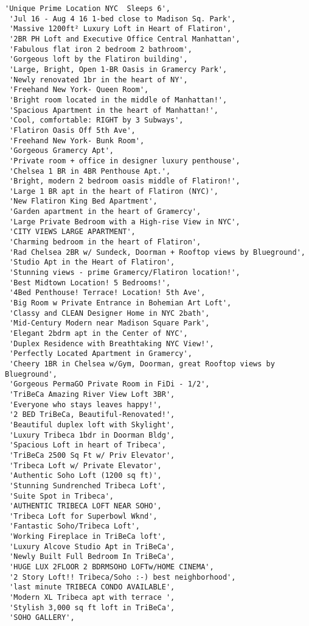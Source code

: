 \documentclass[11pt]{article}
\begin{document}
\begin{tcolorbox}[breakable, size=fbox, boxrule=.5pt, pad at break*=1mm, opacityfill=0]
\begin{Verbatim}[commandchars=\\\{\}]
 'Unique Prime Location NYC  Sleeps 6',
 'Jul 16 - Aug 4 16 1-bed close to Madison Sq. Park',
 'Massive 1200ft² Luxury Loft in Heart of Flatiron',
 '2BR PH Loft and Executive Office Central Manhattan',
 'Fabulous flat iron 2 bedroom 2 bathroom',
 'Gorgeous loft by the Flatiron building',
 'Large, Bright, Open 1-BR Oasis in Gramercy Park',
 'Newly renovated 1br in the heart of NY',
 'Freehand New York- Queen Room',
 'Bright room located in the middle of Manhattan!',
 'Spacious Apartment in the heart of Manhattan!',
 'Cool, comfortable: RIGHT by 3 Subways',
 'Flatiron Oasis Off 5th Ave',
 'Freehand New York- Bunk Room',
 'Gorgeous Gramercy Apt',
 'Private room + office in designer luxury penthouse',
 'Chelsea 1 BR in 4BR Penthouse Apt.',
 'Bright, modern 2 bedroom oasis middle of Flatiron!',
 'Large 1 BR apt in the heart of Flatiron (NYC)',
 'New Flatiron King Bed Apartment',
 'Garden apartment in the heart of Gramercy',
 'Large Private Bedroom with a High-rise View in NYC',
 'CITY VIEWS LARGE APARTMENT',
 'Charming bedroom in the heart of Flatiron',
 'Rad Chelsea 2BR w/ Sundeck, Doorman + Rooftop views by Blueground',
 'Studio Apt in the Heart of Flatiron',
 'Stunning views - prime Gramercy/Flatiron location!',
 'Best Midtown Location! 5 Bedrooms!',
 '4Bed Penthouse! Terrace! Location! 5th Ave',
 'Big Room w Private Entrance in Bohemian Art Loft',
 'Classy and CLEAN Designer Home in NYC 2bath',
 'Mid-Century Modern near Madison Square Park',
 'Elegant 2bdrm apt in the Center of NYC',
 'Duplex Residence with Breathtaking NYC View!',
 'Perfectly Located Apartment in Gramercy',
 'Cheery 1BR in Chelsea w/Gym, Doorman, great Rooftop views by Blueground',
 'Gorgeous PermaGO Private Room in FiDi - 1/2',
 'TriBeCa Amazing River View Loft 3BR',
 'Everyone who stays leaves happy!',
 '2 BED TriBeCa, Beautiful-Renovated!',
 'Beautiful duplex loft with Skylight',
 'Luxury Tribeca 1bdr in Doorman Bldg',
 'Spacious Loft in heart of Tribeca',
 'TriBeCa 2500 Sq Ft w/ Priv Elevator',
 'Tribeca Loft w/ Private Elevator',
 'Authentic Soho Loft (1200 sq ft)',
 'Stunning Sundrenched Tribeca Loft',
 'Suite Spot in Tribeca',
 'AUTHENTIC TRIBECA LOFT NEAR SOHO',
 'Tribeca Loft for Superbowl Wknd',
 'Fantastic Soho/Tribeca Loft',
 'Working Fireplace in TriBeCa loft',
 'Luxury Alcove Studio Apt in TriBeCa',
 'Newly Built Full Bedroom In TriBeCa',
 'HUGE LUX 2FLOOR 2 BDRMSOHO LOFTw/HOME CINEMA',
 '2 Story Loft!! Tribeca/Soho :-) best neighborhood',
 'last minute TRIBECA CONDO AVAILABLE',
 'Modern XL Tribeca apt with terrace ',
 'Stylish 3,000 sq ft loft in TriBeCa',
 'SOHO GALLERY',

\end{Verbatim}
\end{tcolorbox}
\end{document}
